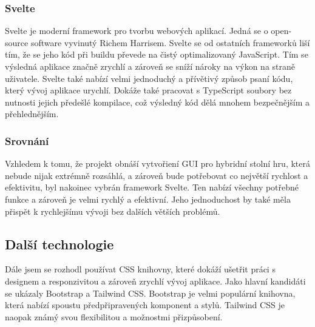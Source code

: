 \subsubsection{Svelte}
Svelte je moderní framework pro tvorbu webových aplikací. Jedná se o open-source software vyvinutý Richem Harrisem. Svelte se od ostatních frameworků liší tím, že se jeho kód při buildu převede na čistý optimalizovaný JavaScript. Tím se výsledná aplikace značně zrychlí a zároveň se sníží nároky na výkon na straně uživatele. Svelte také nabízí velmi jednoduchý a přívětivý způsob psaní kódu, který vývoj aplikace urychlí. Dokáže také pracovat s TypeScript soubory bez nutnosti jejich předešlé kompilace, což výsledný kód dělá mnohem bezpečnějším a přehlednějším.\cite{svelte_and_why_you_should_consider_it,svelte}

\subsubsection{Srovnání}
Vzhledem k tomu, že projekt obnáší vytvořiení GUI pro hybridní stolní hru, která nebude nijak extrémně rozsáhlá, a zároveň bude potřebovat co největší rychlost a efektivitu, byl nakoinec vybrán framework Svelte. Ten nabízí všechny potřebné funkce a zároveň je velmi rychlý a efektivní. Jeho jednoduchost by také měla přispět k rychlejšímu vývoji bez dalších větších problémů.

\subsection{Další technologie}
Dále jsem se rozhodl používat CSS knihovny, které dokáží ušetřit práci s designem a responzivitou a zároveň zrychlí vývoj aplikace. Jako hlavní kandidáti se ukázaly Bootstrap a Tailwind CSS. Bootstrap je velmi populární knihovna, která nabízí spoustu předpřipravených komponent a stylů. Tailwind CSS je naopak známý svou flexibilitou a možnostmi přizpůsobení.